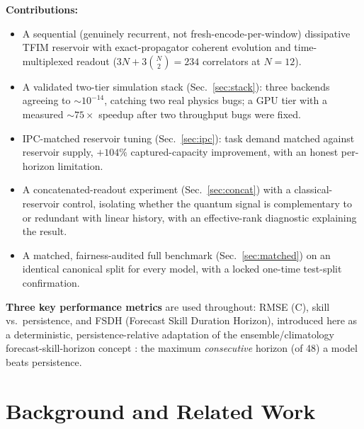\documentclass[11pt]{article}
\begin{document}
\textbf{Contributions:}
\begin{itemize}
\item A sequential (genuinely recurrent, not fresh-encode-per-window) dissipative TFIM reservoir
  with exact-propagator coherent evolution and time-multiplexed readout ($3N+3\binom{N}{2}{=}234$
  correlators at $N{=}12$).
\item A validated two-tier simulation stack (Sec.~\ref{sec:stack}): three backends agreeing to
  $\sim\!10^{-14}$, catching two real physics bugs; a GPU tier with a measured
  $\sim\!75\times$ speedup after two throughput bugs were fixed.
\item IPC-matched reservoir tuning (Sec.~\ref{sec:ipc}): task demand matched against reservoir
  supply, $+104\%$ captured-capacity improvement, with an honest per-horizon limitation.
\item A concatenated-readout experiment (Sec.~\ref{sec:concat}) with a classical-reservoir
  control, isolating whether the quantum signal is complementary to or redundant with linear
  history, with an effective-rank diagnostic explaining the result.
\item A matched, fairness-audited full benchmark (Sec.~\ref{sec:matched}) on an identical
  canonical split for every model, with a locked one-time test-split confirmation.
\end{itemize}

\textbf{Three key performance metrics} are used throughout: RMSE (\textdegree C), skill vs.\
persistence, and FSDH (Forecast Skill Duration Horizon), introduced here as a deterministic,
persistence-relative adaptation of the ensemble/climatology forecast-skill-horizon concept
\cite{buizza2015}: the maximum \emph{consecutive} horizon (of 48) a model beats persistence.

\section{Background and Related Work}
\end{document}
